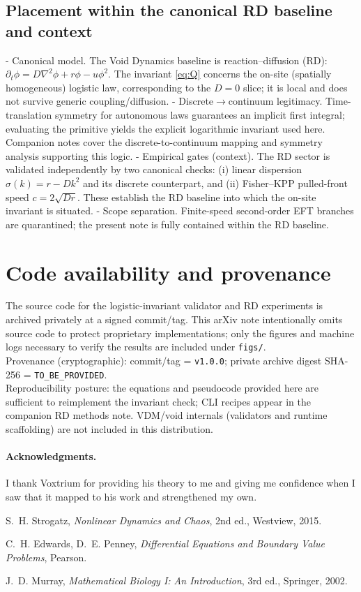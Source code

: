 \documentclass[11pt]{article}
\begin{document}
\subsection*{Placement within the canonical RD baseline and context}
- Canonical model. The Void Dynamics baseline is reaction--diffusion (RD): $\partial_t \phi = D\nabla^2\phi + r\phi - u\phi^2$. The invariant \eqref{eq:Q} concerns the on-site (spatially homogeneous) logistic law, corresponding to the $D=0$ slice; it is local and does not survive generic coupling/diffusion.
- Discrete$\to$continuum legitimacy. Time-translation symmetry for autonomous laws guarantees an implicit first integral; evaluating the primitive yields the explicit logarithmic invariant used here. Companion notes cover the discrete-to-continuum mapping and symmetry analysis supporting this logic.
- Empirical gates (context). The RD sector is validated independently by two canonical checks: (i) linear dispersion $\sigma(k)=r-Dk^2$ and its discrete counterpart, and (ii) Fisher--KPP pulled-front speed $c=2\sqrt{Dr}$. These establish the RD baseline into which the on-site invariant is situated.
- Scope separation. Finite-speed second-order EFT branches are quarantined; the present note is fully contained within the RD baseline.

\section{Code availability and provenance}
The source code for the logistic-invariant validator and RD experiments is archived privately at a signed commit/tag. This arXiv note intentionally omits source code to protect proprietary implementations; only the figures and machine logs necessary to verify the results are included under \texttt{figs/}.\\
Provenance (cryptographic): commit/tag = \texttt{v1.0.0}; private archive digest SHA-256 = \texttt{TO\_BE\_PROVIDED}.\\
Reproducibility posture: the equations and pseudocode provided here are sufficient to reimplement the invariant check; CLI recipes appear in the companion RD methods note. VDM/void internals (validators and runtime scaffolding) are not included in this distribution.
\paragraph{Acknowledgments.}
I thank Voxtrium for providing his theory to me and giving me confidence when I saw that it mapped to his work and strengthened my own.

\begin{thebibliography}{9}
S.~H. Strogatz, \emph{Nonlinear Dynamics and Chaos}, 2nd ed., Westview, 2015.

C.~H. Edwards, D.~E. Penney, \emph{Differential Equations and Boundary Value Problems}, Pearson.

J.~D. Murray, \emph{Mathematical Biology I: An Introduction}, 3rd ed., Springer, 2002.
\end{thebibliography}
\end{document}
